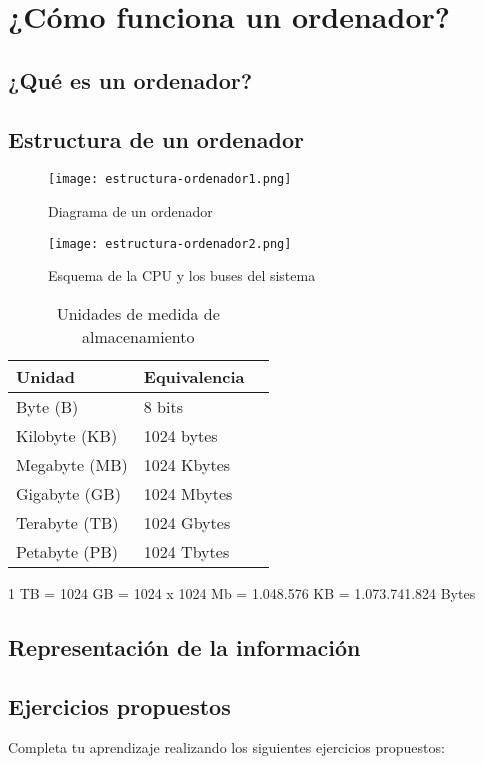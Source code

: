
\chapter{¿Cómo funciona un ordenador?}

\section{¿Qué es un ordenador?}

\section{Estructura de un ordenador}

\begin{figure}[h]
\centering\texttt{[image: estructura-ordenador1.png]}
\caption{Diagrama de un ordenador}
\label{fig:c1fig1}
\end{figure}

\begin{figure}[h]
\centering\texttt{[image: estructura-ordenador2.png]}
\caption{Esquema de la CPU y los buses del sistema}
\label{fig:c1fig2} 
\end{figure}

\begin{table}[h]
\centering
\begin{tabular}{l l l}
\toprule
\textbf{Unidad} & \textbf{Equivalencia}\\
\midrule
Byte (B) & 8 bits \\
Kilobyte (KB) & 1024 bytes \\
Megabyte (MB) & 1024 Kbytes \\
Gigabyte (GB) & 1024 Mbytes \\
Terabyte (TB) & 1024 Gbytes \\
Petabyte (PB) & 1024 Tbytes \\
\bottomrule
\end{tabular}
\caption{Unidades de medida de almacenamiento}
\label{tab:c1tab1} 
\end{table}

1 TB = 1024 GB = 1024 x 1024 Mb = 1.048.576 KB = 1.073.741.824 Bytes

\section{Representación de la información}



\section{Ejercicios propuestos}

Completa tu aprendizaje realizando los siguientes ejercicios propuestos:

